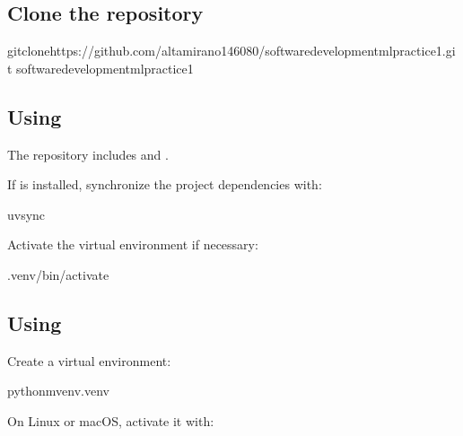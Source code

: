 \documentclass[letterpaper,10pt,english]{sphinxmanual}
\begin{document}
\subsection{Clone the repository}
\label{\detokenize{installation:clone-the-repository}}
\begin{sphinxVerbatim}[commandchars=\\\{\}]
gitclonehttps://github.com/altamirano146080/software\PYGZus{}development\PYGZus{}ml\PYGZus{}practice\PYGZus{}1.git
software\PYGZus{}development\PYGZus{}ml\PYGZus{}practice\PYGZus{}1
\end{sphinxVerbatim}


\subsection{Using }
\label{\detokenize{installation:using-uv}}
\sphinxAtStartPar
The repository includes  and .

\sphinxAtStartPar
If  is installed, synchronize the project dependencies with:

\begin{sphinxVerbatim}[commandchars=\\\{\}]
uvsync
\end{sphinxVerbatim}

\sphinxAtStartPar
Activate the virtual environment if necessary:

\begin{sphinxVerbatim}[commandchars=\\\{\}]
.venv/bin/activate
\end{sphinxVerbatim}


\subsection{Using }
\label{\detokenize{installation:using-venv}}
\sphinxAtStartPar
Create a virtual environment:

\begin{sphinxVerbatim}[commandchars=\\\{\}]
python\PYGZhy{}mvenv.venv
\end{sphinxVerbatim}

\sphinxAtStartPar
On Linux or macOS, activate it with:
\end{document}
